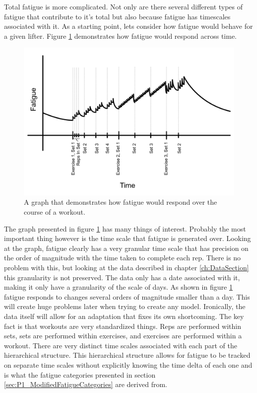 Total fatigue is more complicated. Not only are there several different types of fatigue that contribute to it's total but also because fatigue has timescales associated with it. As a starting point, lets consider how fatigue would behave for a given lifter. Figure \ref{fig:P2C1_GlobalFatigueGraph} demonstrates how fatigue would respond across time.

\begin{figure}[htb]
    \centering
    \includegraphics[scale=0.55]{images/p2/ch1/FatigueGraph.png}
    \caption{A graph that demonstrates how fatigue would respond over the course of a workout.}
    \label{fig:P2C1_GlobalFatigueGraph}
\end{figure}

The graph presented in figure \ref{fig:P2C1_GlobalFatigueGraph} has many things of interest. Probably the most important thing however is the time scale that fatigue is generated over. Looking at the graph, fatigue clearly has a very granular time scale that has precision on the order of magnitude with the time taken to complete each rep. There is no problem with this, but looking at the data described in chapter \ref{ch:DataSection} this granularity is not preserved. The data only has a date associated with it, making it only have a granularity of the scale of days. As shown in figure \ref{fig:P2C1_GlobalFatigueGraph} fatigue responds to changes several orders of magnitude smaller than a day. This will create huge problems later when trying to create any model. Ironically, the data itself will allow for an adaptation that fixes its own shortcoming. The key fact is that workouts are very standardized things. Reps are performed within sets, sets are performed within exercises, and exercises are performed within a workout. There are very distinct time scales associated with each part of the hierarchical structure. This hierarchical structure allows for fatigue to be tracked on separate time scales without explicitly knowing the time delta of each one and is what the fatigue categories presented in section \ref{sec:P1_ModifiedFatigueCategories} are derived from. 

